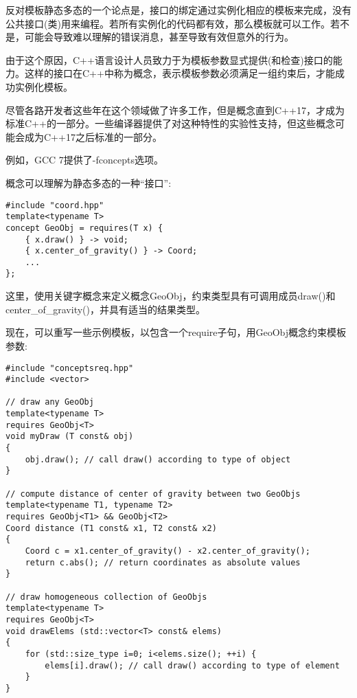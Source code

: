 反对模板静态多态的一个论点是，接口的绑定通过实例化相应的模板来完成，没有公共接口(类)用来编程。若所有实例化的代码都有效，那么模板就可以工作。若不是，可能会导致难以理解的错误消息，甚至导致有效但意外的行为。

由于这个原因，C++语言设计人员致力于为模板参数显式提供(和检查)接口的能力。这样的接口在C++中称为概念，表示模板参数必须满足一组约束后，才能成功实例化模板。

尽管各路开发者这些年在这个领域做了许多工作，但是概念直到C++17，才成为标准C++的一部分。一些编译器提供了对这种特性的实验性支持，但这些概念可能会成为C++17之后标准的一部分。

\begin{tcolorbox}[colback=webgreen!5!white,colframe=webgreen!75!black]
\hspace*{0.75cm}例如，GCC 7提供了-fconcepts选项。
\end{tcolorbox}

概念可以理解为静态多态的一种“接口”:

\begin{lstlisting}[style=styleCXX]
#include "coord.hpp"
template<typename T>
concept GeoObj = requires(T x) {
	{ x.draw() } -> void;
	{ x.center_of_gravity() } -> Coord;
	...
};
\end{lstlisting}

这里，使用关键字概念来定义概念GeoObj，约束类型具有可调用成员draw()和center\_of\_gravity()，并具有适当的结果类型。

现在，可以重写一些示例模板，以包含一个require子句，用GeoObj概念约束模板参数:

\begin{lstlisting}[style=styleCXX]
#include "conceptsreq.hpp"
#include <vector>

// draw any GeoObj
template<typename T>
requires GeoObj<T>
void myDraw (T const& obj)
{
	obj.draw(); // call draw() according to type of object
}

// compute distance of center of gravity between two GeoObjs
template<typename T1, typename T2>
requires GeoObj<T1> && GeoObj<T2>
Coord distance (T1 const& x1, T2 const& x2)
{
	Coord c = x1.center_of_gravity() - x2.center_of_gravity();
	return c.abs(); // return coordinates as absolute values
}

// draw homogeneous collection of GeoObjs
template<typename T>
requires GeoObj<T>
void drawElems (std::vector<T> const& elems)
{
	for (std::size_type i=0; i<elems.size(); ++i) {
		elems[i].draw(); // call draw() according to type of element
	}
}
\end{lstlisting}

